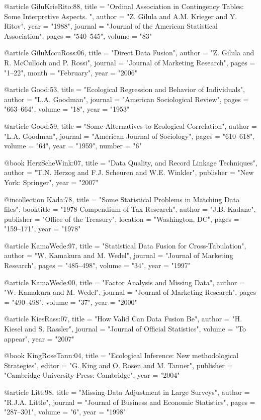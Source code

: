 @article{ GiluKrieRito:88,
	title = "Ordinal Association in Contingency Tables: Some Interpretive Aspects. ",
	author = "Z. Gilula and A.M. Krieger and Y. Ritov",
	year = "1988",
	journal = "Journal of the American Statistical Association",
	pages = "540--545",
	volume = "83"
}

@article{ GiluMccuRoss:06,
	title = "Direct Data Fusion",
	author = "Z. Gilula and R. McCulloch and P. Rossi",
	journal = "Journal of Marketing Research",
	pages = "1--22",
	month = "February",
	year = "2006"
}

@article{ Good:53,
	title = "Ecological Regression and Behavior of Individuals",
	author = "L.A. Goodman",
	journal = "American Sociological Review",
	pages = "663--664",
	volume = "18",
	year = "1953"
}

@article{ Good:59,
	title = "Some Alternatives to Ecological Correlation",
	author = "L.A. Goodman",
	journal = "American Journal of Sociology",
	pages = "610--618",
	volume = "64",
	year = "1959",
	number = "6"
}

@book{ HerzScheWink:07,
	title = "Data Quality, and Record Linkage Techniques",
	author = "T.N. Herzog and F.J. Scheuren and W.E. Winkler",
	publisher = "New York: Springer",
	year = "2007"
}

@incollection{ Kada:78,
	title = "Some Statistical Problems in Matching Data files",
	booktitle = "1978 Compendium of Tax Research",
	author = "J.B. Kadane",
	publisher = "Office of the Treasury",
	location = "Washington, DC",
	pages = "159--171",
	year = "1978"
}

@article{ KamaWede:97,
	title = "Statistical Data Fusion for Cross-Tabulation",
	author = "W. Kamakura and M. Wedel",
	journal = "Journal of Marketing Research",
	pages = "485--498",
	volume = "34",
	year = "1997"
}

@article{ KamaWede:00,
	title = "Factor Analysis and Missing Data",
	author = "W. Kamakura and M. Wedel",
	journal = "Journal of Marketing Research",
	pages = "490--498",
	volume = "37",
	year = "2000"
}

@article{ KiesRass:07,
	title = "How Valid Can Data Fusion Be",
	author = "H. Kiesel and S. Rassler",
	journal = "Journal of Official Statistics",
	volume = "To appear",
    year = "2007"
}

@book{ KingRoseTann:04,
	title = "Ecological Inference: New methodological Strategies",
	editor = "G. King and O. Rosen and M. Tanner",
	publisher = "Cambridge University Press: Cambridge",
	year = "2004"
}

@article{ Litt:98,
	title = "Missing-Data Adjustment in Large Surveys",
	author = "R.J.A. Little",
	journal = "Journal of Business and Economic Statistics",
	pages = "287--301",
	volume = "6",
	year = "1998"
}

